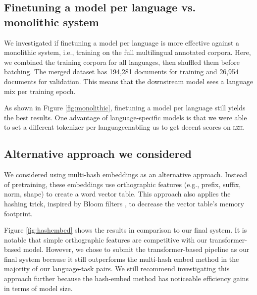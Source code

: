 \documentclass[11pt]{article}
\begin{document}
\subsection{Finetuning a model per language vs. monolithic system}

We investigated if finetuning a model per language is more effective against a monolithic system, i.e., training on the full multilingual annotated corpora.
Here, we combined the training corpora for all languages, then shuffled them before batching.
The merged dataset has 194,281 documents for training and 26,954 documents for validation.
This means that the downstream model sees a language mix per training epoch.

As shown in Figure \ref{fig:monolithic}, finetuning a model per language still yields the best results.
One advantage of language-specific models is that we were able to set a different tokenizer per language\textemdash enabling us to get decent scores on \textsc{lzh}.


\subsection{Alternative approach we considered}


We considered using multi-hash embeddings \cite{miranda-etal-2022-multi} as an alternative approach.
Instead of pretraining, these embeddings use orthographic features (e.g., prefix, suffix, norm, shape) to create a word vector table.
This approach also applies the hashing trick, inspired by Bloom filters \cite{bloom-1970-space}, to decrease the vector table's memory footprint.

Figure \ref{fig:hashembed} shows the results in comparison to our final system.
It is notable that simple orthographic features are competitive with our transformer-based model.
However, we chose to submit the transformer-based pipeline as our final system because it still outperforms the multi-hash embed method in the majority of our language-task pairs. 
We still recommend investigating this approach further because the hash-embed method has noticeable efficiency gains in terms of model size.
\end{document}
